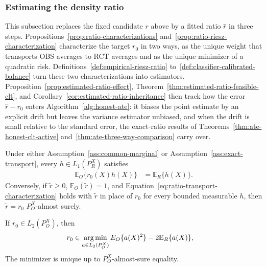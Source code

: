 \subsubsection{Estimating the density ratio}
\label{sec:ratio-estimation}

This subsection replaces the fixed candidate $r$ above by a fitted ratio $\widehat r$ in three steps. Propositions~\ref{prop:ratio-characterizations} and~\ref{prop:ratio-riesz-characterization} characterize the target $r_0$ in two ways, as the unique weight that transports OBS averages to RCT averages and as the unique minimizer of a quadratic risk. Definitions~\ref{def:empirical-riesz-ratio} to~\ref{def:classifier-calibrated-balance} turn these two characterizations into estimators. Proposition~\ref{prop:estimated-ratio-effect}, Theorem~\ref{thm:estimated-ratio-feasible-clt}, and Corollary~\ref{cor:estimated-ratio-inheritance} then track how the error $\widehat r-r_0$ enters Algorithm~\ref{alg:honest-ate}: it biases the point estimate by an explicit drift but leaves the variance estimator unbiased, and when the drift is small relative to the standard error, the exact-ratio results of Theorems~\ref{thm:ate-honest-clt-active} and~\ref{thm:ate-three-way-comparison} carry over.

\begin{proposition}
\label{prop:ratio-characterizations}
	Under either Assumption~\ref{ass:common-marginal} or Assumption~\ref{ass:exact-transport}, every $h\in L_1(P_R^X)$ satisfies
	\begin{align}
		\mathbb E_O\{r_0(X)h(X)\} &=\mathbb E_R\{h(X)\}.
		\label{eq:ratio-transport-characterization}
	\end{align}
	Conversely, if $\widetilde r\geq0$, $\mathbb E_O(\widetilde r)=1$, and Equation~\eqref{eq:ratio-transport-characterization} holds with $\widetilde r$ in place of $r_0$ for every bounded measurable $h$, then $\widetilde r=r_0$ $P_O^X$-almost surely.
\end{proposition}

\begin{proposition}
\label{prop:ratio-riesz-characterization}
If $r_0\in L_2(P_O^X)$, then
\begin{align}\label{eq:ratio-riesz-population}
	r_0 &\in\operatorname*{arg\,min}_{a\in L_2(P_O^X)}\mathcal \mathbb E_O\{a(X)^2\}-2\mathbb E_R\{a(X)\},
\end{align}
The minimizer is unique up to $P_O^X$-almost-sure equality.
\end{proposition}

